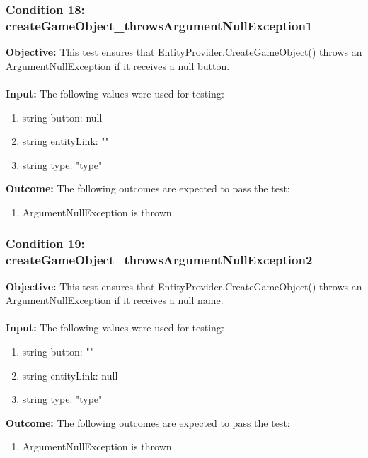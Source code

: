 \documentclass[a4paper,12pt]{article}
\begin{document}
		\subsubsection{Condition 18: createGameObject\_throwsArgumentNullException1}
			\textbf{Objective:} This test ensures that EntityProvider.CreateGameObject() throws an ArgumentNullException if it receives a null button.\\\\
			\textbf{Input:} The following values were used for testing:
				\begin{enumerate}
					\item string button: null
					\item string entityLink: ""
					\item string type: "type"
				\end{enumerate}
			\textbf{Outcome:} The following outcomes are expected to pass the test:
				\begin{enumerate}
					\item ArgumentNullException is thrown.
				\end{enumerate}
		\subsubsection{Condition 19: createGameObject\_throwsArgumentNullException2}
			\textbf{Objective:} This test ensures that EntityProvider.CreateGameObject() throws an ArgumentNullException if it receives a null name.\\\\
			\textbf{Input:} The following values were used for testing:
				\begin{enumerate}
					\item string button: ""
					\item string entityLink: null
					\item string type: "type"
				\end{enumerate}
			\textbf{Outcome:} The following outcomes are expected to pass the test:
				\begin{enumerate}
					\item ArgumentNullException is thrown.
				\end{enumerate}
\end{document}
